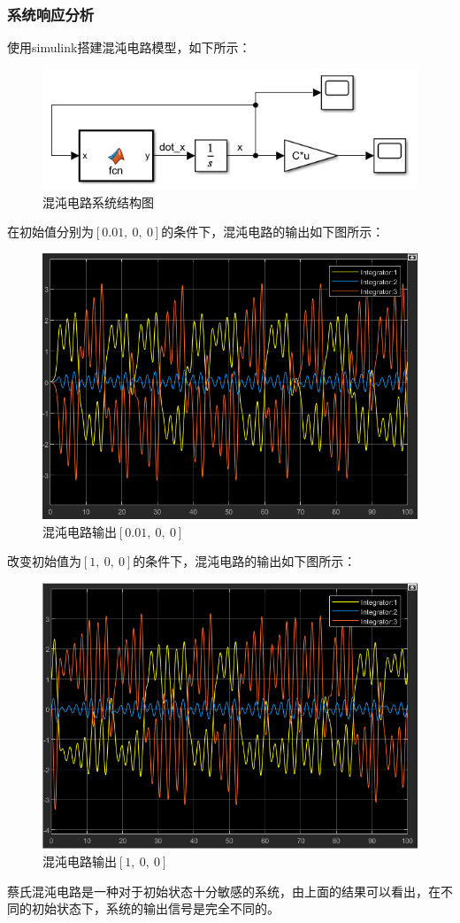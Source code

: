 \documentclass[UTF8]{article}
\begin{document}
\subsubsection{系统响应分析}
使用simulink搭建混沌电路模型，如下所示：
\begin{figure}[H]
    \centering %
    \includegraphics[width=.6\textwidth]{figure/混沌电路-系统结构图.png}
    \caption{混沌电路系统结构图} %
\end{figure}
在初始值分别为$[0.01,\ 0,\ 0]$的条件下，混沌电路的输出如下图所示：
\begin{figure}[H]
    \centering %
    \includegraphics[width=.6\textwidth]{figure/混沌电路-单个系统输出.png}
    \caption{混沌电路输出$[0.01,\ 0,\ 0]$} %
\end{figure}
改变初始值为$[1,\ 0,\ 0]$的条件下，混沌电路的输出如下图所示：
\begin{figure}[H]
    \centering %
    \includegraphics[width=.6\textwidth]{figure/混沌电路-单个系统输出2.png}
    \caption{混沌电路输出$[1,\ 0,\ 0]$} %
\end{figure}
蔡氏混沌电路是一种对于初始状态十分敏感的系统，由上面的结果可以看出，在不同的初始状态下，系统的输出信号是完全不同的。
\end{document}
